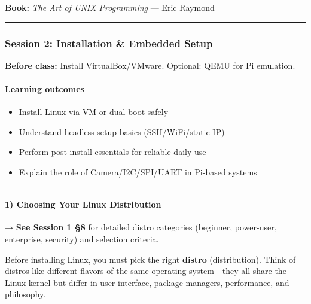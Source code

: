 \documentclass[
  english,
  paper=a4,
  oneside  ,captions=tableheading
]{scrartcl}
\providecommand{\tightlist}{%
  \setlength{\itemsep}{0pt}\setlength{\parskip}{0pt}}
\renewenvironment{quote}{\begin{customblockquote}\list{}{\rightmargin=0em\leftmargin=0em}%
\item\relax\color{blockquote-text}\ignorespaces}{\unskip\unskip\endlist\end{customblockquote}}
\begin{document}
\textbf{Book:} \emph{The Art of UNIX Programming} --- Eric Raymond

\begin{center}\rule{0.5\linewidth}{0.5pt}\end{center}

\subsubsection{Session 2: Installation \& Embedded
Setup}\label{session-2-installation-embedded-setup}

\begin{quote}
\textbf{Before class:} Install VirtualBox/VMware. Optional: QEMU for Pi
emulation.
\end{quote}

\paragraph{Learning outcomes}\label{learning-outcomes-1}

\begin{itemize}
\tightlist
\item
  Install Linux via VM or dual boot safely
\item
  Understand headless setup basics (SSH/WiFi/static IP)
\item
  Perform post-install essentials for reliable daily use
\item
  Explain the role of Camera/I2C/SPI/UART in Pi-based systems
\end{itemize}

\begin{center}\rule{0.5\linewidth}{0.5pt}\end{center}

\paragraph{1) Choosing Your Linux
Distribution}\label{choosing-your-linux-distribution}

\begin{quote}
→ \textbf{See Session 1 §8} for detailed distro categories (beginner,
power-user, enterprise, security) and selection criteria.
\end{quote}

Before installing Linux, you must pick the right \textbf{distro}
(distribution). Think of distros like different flavors of the same
operating system---they all share the Linux kernel but differ in user
interface, package managers, performance, and philosophy.
\end{document}
